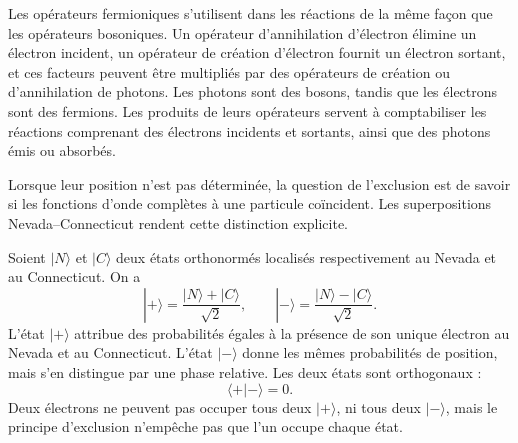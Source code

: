 Les opérateurs fermioniques s’utilisent dans les réactions de la même façon que les opérateurs bosoniques. Un opérateur d’annihilation d’électron élimine un électron incident, un opérateur de création d’électron fournit un électron sortant, et ces facteurs peuvent être multipliés par des opérateurs de création ou d’annihilation de photons. Les photons sont des bosons, tandis que les électrons sont des fermions. Les produits de leurs opérateurs servent à comptabiliser les réactions comprenant des électrons incidents et sortants, ainsi que des photons émis ou absorbés.

\begin{classroomqa}
\end{classroomqa}


Lorsque leur position n’est pas déterminée, la question de l’exclusion est de savoir si les fonctions d’onde complètes à une particule coïncident. Les superpositions Nevada--Connecticut rendent cette distinction explicite.

Soient \(|N\rangle\) et \(|C\rangle\) deux états orthonormés localisés respectivement au Nevada et au Connecticut. On a
\begin{equation}
|+\rangle=\frac{|N\rangle+|C\rangle}{\sqrt2},
\qquad
|-\rangle=\frac{|N\rangle-|C\rangle}{\sqrt2}.
\end{equation}
L’état \(|+\rangle\) attribue des probabilités égales à la présence de son unique électron au Nevada et au Connecticut. L’état \(|-\rangle\) donne les mêmes probabilités de position, mais s’en distingue par une phase relative. Les deux états sont orthogonaux :
\begin{equation}
\langle+|-\rangle=0.
\end{equation}
Deux électrons ne peuvent pas occuper tous deux \(|+\rangle\), ni tous deux \(|-\rangle\), mais le principe d’exclusion n’empêche pas que l’un occupe chaque état.

\begin{classroomqa}
\end{classroomqa}

